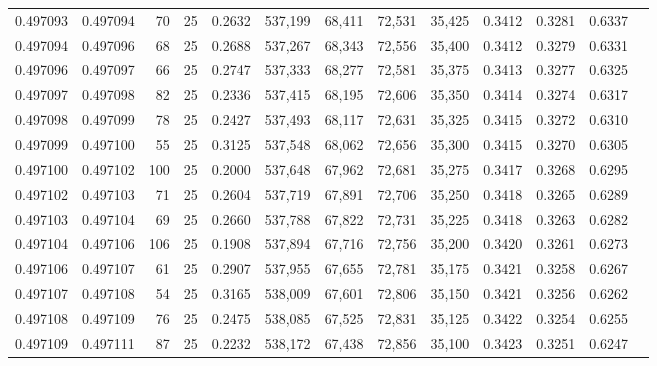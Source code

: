 \begin{tabular}{rrrrrrrrrrrrr}
0.497093 & 0.497094 &    70 &  25 &                                     0.2632 & 537,199 &  68,411 &  72,531 &  35,425 & 0.3412 & 0.3281 & 0.6337 \\
0.497094 & 0.497096 &    68 &  25 &                                     0.2688 & 537,267 &  68,343 &  72,556 &  35,400 & 0.3412 & 0.3279 & 0.6331 \\
0.497096 & 0.497097 &    66 &  25 &                                     0.2747 & 537,333 &  68,277 &  72,581 &  35,375 & 0.3413 & 0.3277 & 0.6325 \\
0.497097 & 0.497098 &    82 &  25 &                                     0.2336 & 537,415 &  68,195 &  72,606 &  35,350 & 0.3414 & 0.3274 & 0.6317 \\
0.497098 & 0.497099 &    78 &  25 &                                     0.2427 & 537,493 &  68,117 &  72,631 &  35,325 & 0.3415 & 0.3272 & 0.6310 \\
0.497099 & 0.497100 &    55 &  25 &                                     0.3125 & 537,548 &  68,062 &  72,656 &  35,300 & 0.3415 & 0.3270 & 0.6305 \\
0.497100 & 0.497102 &   100 &  25 &                                     0.2000 & 537,648 &  67,962 &  72,681 &  35,275 & 0.3417 & 0.3268 & 0.6295 \\
0.497102 & 0.497103 &    71 &  25 &                                     0.2604 & 537,719 &  67,891 &  72,706 &  35,250 & 0.3418 & 0.3265 & 0.6289 \\
0.497103 & 0.497104 &    69 &  25 &                                     0.2660 & 537,788 &  67,822 &  72,731 &  35,225 & 0.3418 & 0.3263 & 0.6282 \\
0.497104 & 0.497106 &   106 &  25 &                                     0.1908 & 537,894 &  67,716 &  72,756 &  35,200 & 0.3420 & 0.3261 & 0.6273 \\
0.497106 & 0.497107 &    61 &  25 &                                     0.2907 & 537,955 &  67,655 &  72,781 &  35,175 & 0.3421 & 0.3258 & 0.6267 \\
0.497107 & 0.497108 &    54 &  25 &                                     0.3165 & 538,009 &  67,601 &  72,806 &  35,150 & 0.3421 & 0.3256 & 0.6262 \\
0.497108 & 0.497109 &    76 &  25 &                                     0.2475 & 538,085 &  67,525 &  72,831 &  35,125 & 0.3422 & 0.3254 & 0.6255 \\
0.497109 & 0.497111 &    87 &  25 &                                     0.2232 & 538,172 &  67,438 &  72,856 &  35,100 & 0.3423 & 0.3251 & 0.6247 \\

\end{tabular}
